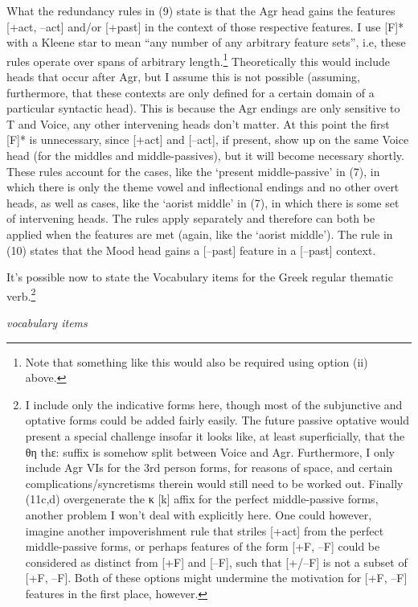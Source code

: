 \documentclass[]{ling-200b-2}
\begin{document}
\noindent \hfill \par
What the redundancy rules in (9) state is that the Agr head gains the features [+act, --act] and/or [+past] in the context of those respective features. I use [F]* with a Kleene star to mean ``any number of any arbitrary feature sets'', i.e, these rules operate over spans of arbitrary length.\footnote{Note that something like this would also be required using option (ii) above.} Theoretically this would include heads that occur after Agr, but I assume this is not possible (assuming, furthermore, that these contexts are only defined for a certain domain of a particular syntactic head). This is because the Agr endings are only sensitive to T and Voice, any other intervening heads don't matter. At this point the first [F]* is unnecessary, since [+act] and [--act], if present, show up on the same Voice head (for the middles and middle-passives), but it will become necessary shortly. These rules account for the cases, like the `present middle-passive' in (7), in which there is only the theme vowel and inflectional endings and no other overt heads, as well as cases, like the `aorist middle' in (7), in which there is some set of intervening heads. The rules apply separately and therefore can both be applied when the features are met (again, like the `aorist middle'). The rule in (10) states that the Mood head gains a [--past] feature in a [--past] context. 

It's possible now to state the Vocabulary items for the Greek regular thematic verb.\footnote{I include only the indicative forms here, though most of the subjunctive and optative forms could be added fairly easily. The future passive optative would present a special challenge insofar it looks like, at least superficially, that the θη t\super hε: suffix is somehow split between Voice and Agr. Furthermore, I only include Agr VIs for the 3rd person forms, for reasons of space, and certain complications/syncretisms therein would still need to be worked out. Finally (11c,d) overgenerate the κ [k] affix for the perfect middle-passive forms, another problem I won't deal with explicitly here. One could however, imagine another impoverishment rule that striles [+act] from the perfect middle-passive forms, or perhaps features of the form [+F, --F] could be considered as distinct from [+F] and [--F], such that [+/--F] is not a subset of [+F, --F]. Both of these options might undermine the motivation for [+F, --F] features in the first place, however.}

\noindent \hfill \par
\ex \textit{vocabulary items}
\end{document}
